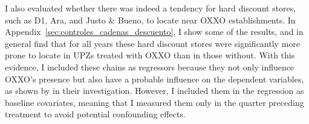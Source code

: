 \documentclass[12pt]{article}
\begin{document}
I also evaluated whether there was indeed a tendency for hard discount stores, such as D1, Ara, and Justo \& Bueno, to locate near OXXO establishments. In Appendix~\ref{sec:controles_cadenas_descuento}, I show some of the results, and in general find that for all years these hard discount stores were significantly more prone to locate in UPZs treated with OXXO than in those without. With this evidence, I included these chains as regressors because they not only influence OXXO's presence but also have a probable influence on the dependent variables, as shown by \textcite{jaramillo2021low} in their investigation. However, I included them in the regression as baseline covariates, meaning that I measured them only in the quarter preceding treatment to avoid potential confounding effects.\\
\end{document}
